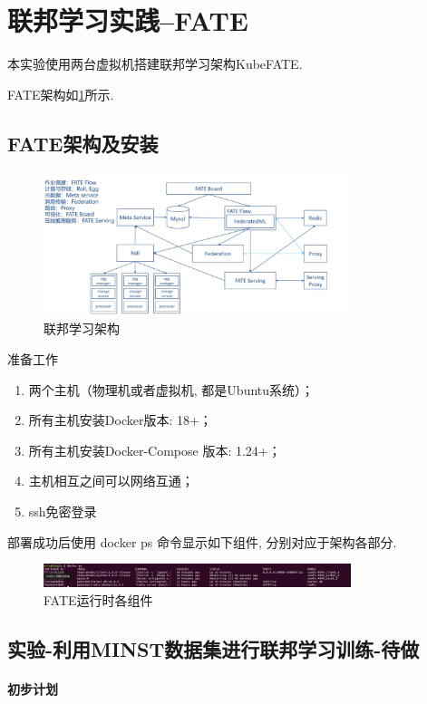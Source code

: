 \documentclass[a4paper]{article}
\theoremstyle{definition}
\numberwithin{equation}{section}
\begin{document}
\section{联邦学习实践--FATE}
本实验使用两台虚拟机搭建联邦学习架构KubeFATE. 

FATE架构如\ref{fate_architecture}所示. 
\subsection{FATE架构及安装}
\begin{figure}[htb]
    \center
\includegraphics[width=0.8\textwidth]{fate1.jpg}
\caption{联邦学习架构}
\label{fate_architecture}
\end{figure}

准备工作
\begin{enumerate}
    \item 两个主机（物理机或者虚拟机, 都是Ubuntu系统）；
    \item 所有主机安装Docker版本: 18+；
    \item 所有主机安装Docker-Compose 版本: 1.24+；
    \item 主机相互之间可以网络互通；
    \item ssh免密登录
\end{enumerate}
部署成功后使用 docker ps 命令显示如下组件, 分别对应于架构各部分. 
\begin{figure}[!ht]
    \center
\includegraphics[width=0.8\textwidth]{fate_success.jpg}
\caption{FATE运行时各组件}
\end{figure}

\subsection{实验-利用MINST数据集进行联邦学习训练-待做}

\paragraph{初步计划}
\end{document}
